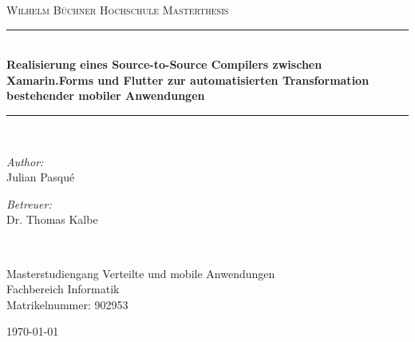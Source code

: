 \begin{titlepage}
\begin{center}
\newcommand{\HRule}{\rule{.9\linewidth}{.6pt}} %

\vspace*{.06\textheight}
{\scshape\LARGE Wilhelm Büchner Hochschule}\vspace{1.5cm} %
\textsc{\Large Masterthesis}\\[0.5cm] %

\HRule \\[0.4cm] %
{\huge \bfseries Realisierung eines Source-to-Source Compilers zwischen Xamarin.Forms und Flutter zur automatisierten Transformation bestehender mobiler Anwendungen}\vspace{0.4cm} %
\HRule \\[1.5cm] %
 
\begin{minipage}[t]{0.4\textwidth}
\begin{flushleft} \large
\emph{Author:}\\
Julian Pasqué %
\end{flushleft}
\end{minipage}
\begin{minipage}[t]{0.4\textwidth}
\begin{flushright} \large
\emph{Betreuer:} \\
Dr. Thomas Kalbe %
\end{flushright}
\end{minipage}\\[3cm]
 
\vfill


\large Masterstudiengang  Verteilte und mobile Anwendungen\\[0.8cm] %
\large Fachbereich Informatik\\[0.8cm] %
\large Matrikelnummer: 902953 \\[0.8cm] %
 
\vfill

{\large \today}\\[6cm] %
 
\vfill
\end{center}
\end{titlepage}